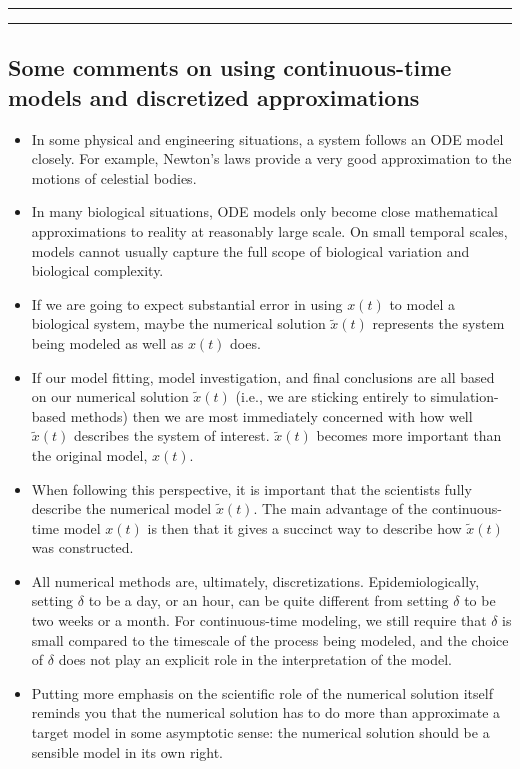 \documentclass[]{article}
\begin{document}
\begin{center}\rule{0.5\linewidth}{\linethickness}\end{center}

\begin{center}\rule{0.5\linewidth}{\linethickness}\end{center}

\subsection{Some comments on using continuous-time models and
discretized
approximations}\label{some-comments-on-using-continuous-time-models-and-discretized-approximations}

\begin{itemize}
\item
  In some physical and engineering situations, a system follows an ODE
  model closely. For example, Newton's laws provide a very good
  approximation to the motions of celestial bodies.
\item
  In many biological situations, ODE models only become close
  mathematical approximations to reality at reasonably large scale. On
  small temporal scales, models cannot usually capture the full scope of
  biological variation and biological complexity.
\item
  If we are going to expect substantial error in using \(x(t)\) to model
  a biological system, maybe the numerical solution \(\tilde x(t)\)
  represents the system being modeled as well as \(x(t)\) does.
\item
  If our model fitting, model investigation, and final conclusions are
  all based on our numerical solution \(\tilde x(t)\) (i.e., we are
  sticking entirely to simulation-based methods) then we are most
  immediately concerned with how well \(\tilde x(t)\) describes the
  system of interest. \(\tilde x(t)\) becomes more important than the
  original model, \(x(t)\).
\item
  When following this perspective, it is important that the scientists
  fully describe the numerical model \(\tilde x(t)\). The main advantage
  of the continuous-time model \(x(t)\) is then that it gives a succinct
  way to describe how \(\tilde x(t)\) was constructed.
\item
  All numerical methods are, ultimately, discretizations.
  Epidemiologically, setting \(\delta\) to be a day, or an hour, can be
  quite different from setting \(\delta\) to be two weeks or a month.
  For continuous-time modeling, we still require that \(\delta\) is
  small compared to the timescale of the process being modeled, and the
  choice of \(\delta\) does not play an explicit role in the
  interpretation of the model.
\item
  Putting more emphasis on the scientific role of the numerical solution
  itself reminds you that the numerical solution has to do more than
  approximate a target model in some asymptotic sense: the numerical
  solution should be a sensible model in its own right.
\end{itemize}
\end{document}
